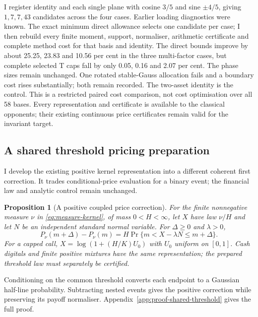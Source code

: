 \documentclass[11pt]{article}
\newtheorem{proposition}[theorem]{Proposition}
\begin{document}
I register identity and each single plane with cosine $3/5$ and sine
$\pm4/5$, giving $1,7,7,43$ candidates across the four cases. Earlier
loading diagnostics were known. The exact minimum direct allowance selects
one candidate per case; I then rebuild every finite moment, support,
normaliser, arithmetic certificate and complete method cost for that basis
and identity. The direct bounds improve by about 25.25, 23.83 and 10.56
per cent in the three multi-factor cases, but complete selected T caps fall
by only 0.05, 0.16 and 2.07 per cent. The phase sizes remain unchanged.
One rotated stable-Gauss allocation fails and a boundary cost rises
substantially; both remain recorded. The two-asset identity is the control.
This is a restricted paired cost comparison, not cost optimisation over
all 58 bases. Every representation and certificate is available to the
classical opponents; their existing continuous price certificates remain
valid for the invariant target.

\subsection{A shared threshold pricing preparation}
\label{sec:shared-threshold}

I develop the existing positive kernel representation into a different
coherent first correction. It trades conditional-price evaluation for a
binary event; the financial law and analytic control remain unchanged.

\begin{proposition}[A positive coupled price correction]
\label{prop:shared-threshold}
For the finite nonnegative measure $\nu$ in
\eqref{eq:measure-kernel}, of mass $0<H<\infty$, let $X$ have law
$\nu/H$ and let $N$ be an independent standard normal variable. For
$\Delta\geq0$ and $\lambda>0$,
\begin{equation}
P_\nu(m+\Delta)-P_\nu(m)
=H\Pr\{m<X-\lambda N\leq m+\Delta\}.
\end{equation}
For a capped call, $X=\log(1+(H/K)U_0)$ with $U_0$ uniform on $[0,1]$.
Cash digitals and finite positive mixtures have the same representation;
the prepared threshold law must separately be certified.
\end{proposition}
Conditioning on the common threshold converts each endpoint to a Gaussian half-line probability. Subtracting nested events gives the positive correction while preserving its payoff normaliser. Appendix~\ref{app:proof-shared-threshold} gives the full proof.
\end{document}
